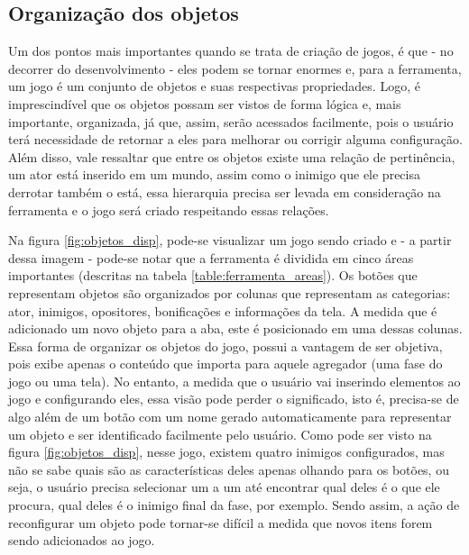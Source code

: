 \documentclass[12pt,twoside,openright,a4paper,english,brazil,sumario=tradicional]{abntex2}
\begin{document}
\subsection{Organização dos objetos}
\label{sec:orga-objetos}
Um dos pontos mais importantes quando se trata de criação de jogos, é que - no decorrer do desenvolvimento - eles podem se tornar enormes e, para a ferramenta, um jogo é um conjunto de objetos e suas respectivas propriedades. Logo, é imprescindível que os objetos possam ser vistos de forma lógica e, mais importante, organizada, já que, assim, serão acessados facilmente, pois o usuário terá necessidade de retornar a eles para melhorar ou corrigir alguma configuração. Além disso, vale ressaltar que entre os objetos existe uma relação de pertinência, um ator está inserido em um mundo, assim como o inimigo que ele precisa derrotar também o está, essa hierarquia precisa ser levada em consideração na ferramenta e o jogo será criado respeitando essas relações.

Na figura \ref{fig:objetos_disp}, pode-se visualizar um jogo sendo criado e - a partir dessa imagem - pode-se notar que a ferramenta é dividida em cinco áreas importantes (descritas na tabela \ref{table:ferramenta_areas}). Os botões que representam objetos são organizados por colunas que representam as categorias: ator, inimigos, opositores, bonificações e informações da tela. A medida que é adicionado um novo objeto para a aba, este é posicionado em uma dessas colunas. Essa forma de organizar os objetos do jogo, possui a vantagem de ser objetiva, pois exibe apenas o conteúdo que importa para aquele agregador (uma fase do jogo ou uma tela). No entanto, a medida que o usuário vai inserindo elementos ao jogo e configurando eles, essa visão pode perder o significado, isto é, precisa-se de algo além de um botão com um nome gerado automaticamente para representar um objeto e ser identificado facilmente pelo usuário. Como pode ser visto na figura \ref{fig:objetos_disp}, nesse jogo, existem quatro inimigos configurados, mas não se sabe quais são as características deles apenas olhando para os botões, ou seja, o usuário precisa selecionar um a um até encontrar qual deles é o que ele procura, qual deles é o inimigo final da fase, por exemplo. Sendo assim, a ação de reconfigurar um objeto pode tornar-se difícil a medida que novos itens forem sendo adicionados ao jogo.
\end{document}
